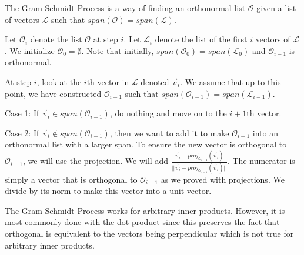 \begin{definition}
    The Gram-Schmidt Process is a way of finding an orthonormal list $\mathcal{O}$ given a list of vectors $\mathcal{L}$ such that $span(\mathcal{O})=span(\mathcal{L})$.

    Let $\mathcal{O}_i$ denote the list $\mathcal{O}$ at step $i$. Let $\mathcal{L}_i$ denote the list of the first $i$ vectors of $\mathcal{L}$. We initialize $\mathcal{O}_0=\emptyset$. Note that initially, $span(\mathcal{O}_0)=span(\mathcal{L}_0)$ and $\mathcal{O}_{i-1}$ is orthonormal.

    At step $i$, look at the $i$th vector in $\mathcal{L}$ denoted $\vec{v}_i$. We assume that up to this point, we have constructed $\mathcal{O}_{i-1}$ such that $span(\mathcal{O}_{i-1})=span(\mathcal{L}_{i-1})$.

    Case 1: If $\vec{v}_i\in span(\mathcal{O}_{i-1})$, do nothing and move on to the $i+1$th vector.

    Case 2: If $\vec{v}_i\notin span(\mathcal{O}_{i-1})$, then we want to add it to make $\mathcal{O}_{i-1}$ into an orthonormal list with a larger span. To ensure the new vector is orthogonal to $\mathcal{O}_{i-1}$, we will use the projection. We will add $\frac{\vec{v}_i-proj_{\mathcal{O}_{i-1}}(\vec{v}_i)}{||\vec{v}_i-proj_{\mathcal{O}_{i-1}}(\vec{v}_i)||}$. The numerator is simply a vector that is orthogonal to $\mathcal{O}_{i-1}$ as we proved with projections. We divide by its norm to make this vector into a unit vector.
\end{definition}
\begin{remark}
    The Gram-Schmidt Process works for arbitrary inner products. However, it is most commonly done with the dot product since this preserves the fact that orthogonal is equivalent to the vectors being perpendicular which is not true for arbitrary inner products.
\end{remark}

